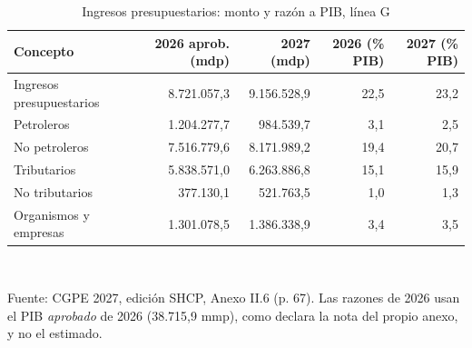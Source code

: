 \begin{table}[htbp]\centering\small
\caption{Ingresos presupuestarios: monto y razón a PIB, línea G}\label{cua:ingpib}
\begin{tabular}{lrrrr}
\toprule
Concepto & 2026 aprob. (mdp) & 2027 (mdp) & 2026 (\% PIB) & 2027 (\% PIB) \\
\midrule
Ingresos presupuestarios & 8.721.057,3 & 9.156.528,9 & 22,5 & 23,2 \\
\quad Petroleros & 1.204.277,7 & 984.539,7 & 3,1 & 2,5 \\
\quad No petroleros & 7.516.779,6 & 8.171.989,2 & 19,4 & 20,7 \\
\quad\quad Tributarios & 5.838.571,0 & 6.263.886,8 & 15,1 & 15,9 \\
\quad\quad No tributarios & 377.130,1 & 521.763,5 & 1,0 & 1,3 \\
\quad\quad Organismos y empresas & 1.301.078,5 & 1.386.338,9 & 3,4 & 3,5 \\
\bottomrule
\end{tabular}
\\[2pt]\begin{minipage}{0.92\textwidth}\scriptsize Fuente: CGPE 2027, edición SHCP, Anexo II.6 (p. 67). Las razones de 2026 usan el PIB \emph{aprobado} de 2026 (38.715,9 mmp), como declara la nota del propio anexo, y no el estimado.\end{minipage}
\end{table}
